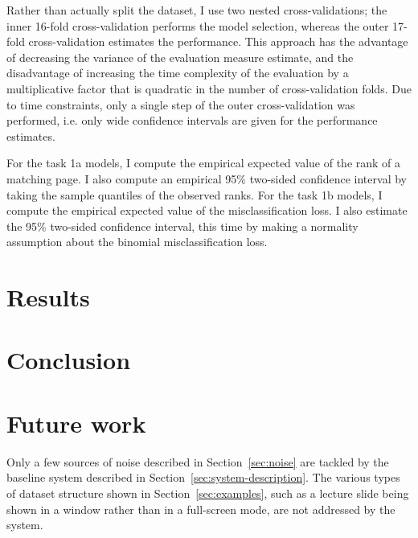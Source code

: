 Rather than actually split the dataset, I use two nested cross-validations; the
inner 16-fold cross-validation performs the model selection, whereas the outer
17-fold cross-validation estimates the performance. This approach has the
advantage of decreasing the variance of the evaluation measure estimate,
and the disadvantage of increasing the time complexity of the evaluation by a
multiplicative factor that is quadratic in the number of cross-validation
folds. Due to time constraints, only a single step of the outer
cross-validation was performed, i.e. only wide confidence intervals are
given for the performance estimates.

For the task 1a models, I compute the empirical expected value of the rank of a
matching page. I also compute an empirical 95\% two-sided confidence interval
by taking the sample quantiles of the observed ranks.
For the task 1b models, I compute the empirical expected value of the
misclassification loss. I also estimate the 95\% two-sided confidence interval,
this time by making a normality assumption about the binomial misclassification
loss.

\section{Results}
\label{sec:results}

\section{Conclusion}
\label{sec:conclusion}

\section{Future work}
\label{sec:future-work}
Only a few sources of noise described in Section~\ref{sec:noise} are tackled by
the baseline system described in Section~\ref{sec:system-description}. The
various types of dataset structure shown in Section~\ref{sec:examples}, such as
a lecture slide being shown in a window rather than in a full-screen mode, are
not addressed by the system.

